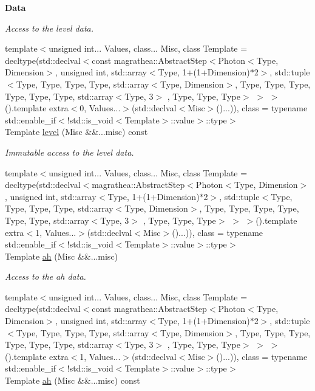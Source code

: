 \begin{Indent}{\bf Data}
\begin{DoxyCompactItemize}
\begin{DoxyCompactList}\small\item\em Access to the level data. \end{DoxyCompactList}\item 
{\footnotesize template$<$unsigned int... Values, class... Misc, class Template  = decltype(std\-::declval$<$const magrathea\-::\-Abstract\-Step$<$\-Photon$<$\-Type, Dimension$>$, unsigned int, std\-::array$<$\-Type, 1+(1+\-Dimension)$\ast$2$>$, std\-::tuple$<$\-Type, Type, Type, Type, std\-::array$<$\-Type, Dimension$>$, Type, Type, Type, Type, Type, Type, std\-::array$<$\-Type, 3$>$ , Type, Type, Type$>$ $>$ $>$().\-template extra$<$0, Values...$>$(std\-::declval$<$\-Misc$>$()...)), class  = typename std\-::enable\-\_\-if$<$!std\-::is\-\_\-void$<$\-Template$>$\-::value$>$\-::type$>$ }\\Template \hyperlink{exceptionPhoton_afc015b92415bc2c9f5278ed83797a1ac}{level} (Misc \&\&...misc) const 
\begin{DoxyCompactList}\small\item\em Immutable access to the level data. \end{DoxyCompactList}\item 
{\footnotesize template$<$unsigned int... Values, class... Misc, class Template  = decltype(std\-::declval$<$magrathea\-::\-Abstract\-Step$<$\-Photon$<$\-Type, Dimension$>$, unsigned int, std\-::array$<$\-Type, 1+(1+\-Dimension)$\ast$2$>$, std\-::tuple$<$\-Type, Type, Type, Type, std\-::array$<$\-Type, Dimension$>$, Type, Type, Type, Type, Type, Type, std\-::array$<$\-Type, 3$>$ , Type, Type, Type$>$ $>$ $>$().\-template extra$<$1, Values...$>$(std\-::declval$<$\-Misc$>$()...)), class  = typename std\-::enable\-\_\-if$<$!std\-::is\-\_\-void$<$\-Template$>$\-::value$>$\-::type$>$ }\\Template \hyperlink{exceptionPhoton_ab6b3f0867d209b8e3d53b431cfeb88ca}{ah} (Misc \&\&...misc)
\begin{DoxyCompactList}\small\item\em Access to the ah data. \end{DoxyCompactList}\item 
{\footnotesize template$<$unsigned int... Values, class... Misc, class Template  = decltype(std\-::declval$<$const magrathea\-::\-Abstract\-Step$<$\-Photon$<$\-Type, Dimension$>$, unsigned int, std\-::array$<$\-Type, 1+(1+\-Dimension)$\ast$2$>$, std\-::tuple$<$\-Type, Type, Type, Type, std\-::array$<$\-Type, Dimension$>$, Type, Type, Type, Type, Type, Type, std\-::array$<$\-Type, 3$>$ , Type, Type, Type$>$ $>$ $>$().\-template extra$<$1, Values...$>$(std\-::declval$<$\-Misc$>$()...)), class  = typename std\-::enable\-\_\-if$<$!std\-::is\-\_\-void$<$\-Template$>$\-::value$>$\-::type$>$ }\\Template \hyperlink{exceptionPhoton_a898ce41416dace830508bee7d5281a61}{ah} (Misc \&\&...misc) const 

\end{DoxyCompactItemize}
\end{Indent}
